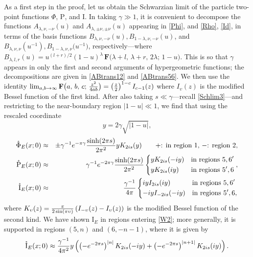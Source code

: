 \documentclass[11pt]{article}
\newcommand{\be}{\begin{equation}}
\newcommand{\ee}{\end{equation}}
\newcommand{\bea}{\begin{eqnarray}}
\newcommand{\eea}{\end{eqnarray}}
\newcommand{\hgfs}{\mathbf{F}}
\newcommand{\lt}{\left}
\newcommand{\rt}{\right}
\newcommand{\Rho}{\mathrm{P}}
\newcommand{\Iota}{\mathrm{I}}
\newcommand{\lam}{\lambda}
\newcommand{\ga}{\gamma}
\newcommand{\ov}{\over}
\begin{document}
As a first step in the proof, let us obtain the Schwarzian limit of the particle two-point functions $\Phi$, $\Rho$, and $\Iota$. In taking $\ga \gg 1$, it is convenient to decompose the functions $A_{\lam, \nu, -\nu}(u)$ and $A_{\lam, \pm \nu, \pm \nu}(u)$ appearing in \eqref{Phi}, and \eqref{Rho}, \eqref{Id}, in terms of the basis functions $B_{\lam, \nu, -\nu}(u), B_{1-\lam, \nu, -\nu}(u)$, and $B_{\lam, \nu, \nu}(u^{-1}), B_{1-\lam, \nu, \nu}\bigl(u^{-1}\bigr)$, respectively---where $B_{\lambda,l,r}(u)=u^{(l+r)/2}(1-u)^{\lambda}\,\hgfs\bigl(\lambda+l,\,\lambda+r,\,2\lambda;\,1-u\bigr)$.
This is so that $\ga$ appears in only the first and second arguments of hypergeometric functions; the decompositions are given in \eqref{ABtrans12} and \eqref{ABtrans56}. We then use the identity $\lim_{a, b\to \infty}\hgfs\bigl(a, \, b, \, c; \, {z^2 \ov 4 a b} \bigr)=\lt({z \ov 2}\rt)^{1-c}I_{c-1}(z)$ where $I_{\upsilon}(z)$ is the modified Bessel function of the first kind. After also taking $s \ll \ga$---recall \eqref{Schlim3}---and restricting to the near-boundary region $|1-u| \ll 1$, we find that using the rescaled coordinate
\be \label{ydef}
y=2\ga \sqrt{|1-u|},
\ee
\bea \label{SchPhi}
\mathring{\Phi}_{E}(x; 0)&\approx& \pm \ga^{-1}e^{-\pi \ga}{\sinh(2\pi s) \ov 2 \pi^2}y K_{2 is }(y) \qquad \text{$+$: in region $1$, $-$: region $2$},\\ \label{SchRho}
\mathring{\Rho}_{E}(x; 0)&\approx&   \ga^{-1}e^{-2\pi \ga}{\sinh(2\pi s) \ov 2 \pi^2} \begin{dcases}
y K_{2 is }(-iy) & \text{in regions $5,6'$}\\
y K_{2 is }(iy) & \text{in regions $5',6$}
\end{dcases},\\ \label{SchG}
\mathring{\Iota}_{E}(x; 0)&\approx&   {\ga^{-1} \ov 4 \pi} \begin{dcases}
i y I_{2 is }(iy) & \text{in regions $5,6'$}\\
-i y I_{-2 is }(-iy) & \text{in regions $5',6$},
\end{dcases}
\eea
where $K_{\upsilon}(z)={\pi \ov 2 \sin(\pi \upsilon)}\lt(I_{-\upsilon}(z)-I_{\upsilon}(z) \rt)$ is the modified Bessel function of the second kind. We have shown $\Iota_E$ in regions entering \eqref{W2}; more generally, it is supported in regions $(5,n)$ and $(6, -n-1)$, where it is given by
\be \label{genSchG}
\mathring{\Iota}_E(x;0)\approx {\ga^{-1} \ov 4 \pi^2} y\lt(\lt( -e^{-2\pi s}\rt)^{|n|}K_{2is}(-i y)+\lt(-e^{-2\pi s}\rt)^{|n+1|}K_{2i s}(i y)\rt).
\ee
\end{document}

